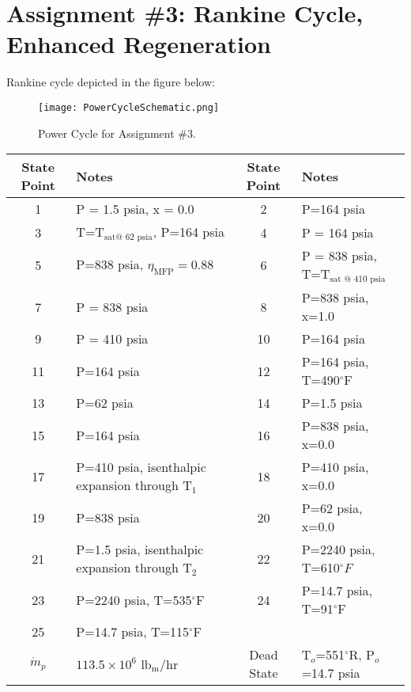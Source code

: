 \chapter{Assignment \#3: Rankine Cycle, Enhanced Regeneration}
\label{ch:ass3}

\begin{fullwidth}
 Rankine cycle depicted in the figure below:

\begin{figure}
\texttt{[image: PowerCycleSchematic.png]}
\caption{Power Cycle for Assignment \#3.}
\end{figure}

\begin{table}
\begin{tabular}{c | l || c | l}
\toprule
State Point & Notes & State Point & Notes \\
\hline
1 & P = 1.5 psia, x = 0.0 & 2 & P=164 psia \\
\hline
3 & T=T$_{\text{sat@ 62 psia}}$, P=164 psia & 4 & P = 164 psia\\
\hline
5 & P=838 psia, $\eta_{\text{MFP}} = 0.88$ & 6 & P = 838 psia, T=T$_{\text{sat @ 410 psia}}$ \\
\hline
7 & P = 838 psia & 8 & P=838 psia, x=1.0 \\
\hline
9 & P = 410 psia & 10 & P=164 psia \\
\hline
11 & P=164 psia & 12 & P=164 psia, T=490$^{\circ}$F \\
\hline
13 & P=62 psia & 14 & P=1.5 psia \\
\hline
15 & P=164 psia & 16 & P=838 psia, x=0.0 \\
\hline
17 & P=410 psia, isenthalpic expansion through T$_{1}$ & 18 & P=410 psia, x=0.0 \\
\hline
19 & P=838 psia & 20 & P=62 psia, x=0.0 \\
\hline
21 & P=1.5 psia, isenthalpic expansion through T$_{2}$ & 22 & P=2240 psia, T=610$^{\circ}F$ \\
\hline
23 & P=2240 psia, T=535$^{\circ}$F & 24 & P=14.7 psia, T=91$^{\circ}$F \\
\hline
25 & P=14.7 psia, T=115$^{\circ}$F & & \\
\hline
$\dot{m}_{p}$ & $113.5 \times 10^{6}$ lb$_{\text{m}}$/hr & Dead State & T$_{o}$=551$^{\circ}$R, P$_{o}$=14.7 psia \\
\bottomrule
\end{tabular}
\end{table}


\end{fullwidth}
